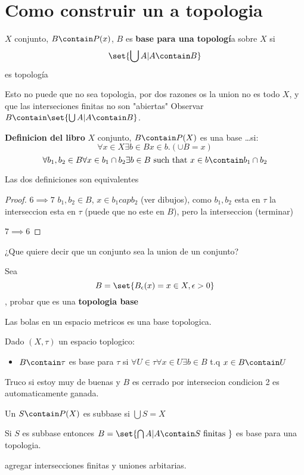 \section{Como construir un a topologia}
\begin{define}
	$X$ conjunto, $B \contain P(x) $, $B$ es \textbf{base para una topologí}a sobre $X$ si
	\[ \set{\bigcup A | A \contain B} \]
	es topología
\end{define}
Esto no puede que no sea topologia, por dos razones os la union no es todo $X$, y que las interseciones finitas no son "abiertas"
Observar $ B \contain \set{\bigcup A | A \contain B} $.

\begin{define}
	\textbf{Definicion del libro} $X$ conjunto, $ B \contain P(X) $ es una base \ldots si:
	\[ \forall x \in X \exists b \in B x \in b. (\cup B = x) \]
	\[ \forall b_1, b_2 \in B \forall x \in b_1 \cap b_2 \exists b \in B \text{ such that } x \in b \contain b_1 \cap b_2 \]
\end{define}

\begin{thm}
	Las dos definiciones son equivalentes
\end{thm}

\begin{proof}
	$ 6 \implies 7 $  $ b_1, b_2 \in B$, $ x \in b_1 cap b_2$ (ver dibujos), como $ b_1, b_2$ esta en $ \tau$ la interseccion esta en $\tau$ (puede que no este en $B$), pero la interseccion (terminar)   
	
	$ 7 \implies 6 $
\end{proof}
¿Que quiere decir que un conjunto sea la union de un conjunto?

\begin{thm}
	Sea \[B = \set{B_\epsilon(x) = x \in X, \epsilon > 0 } \], probar que es una \textbf{topologia base}
\end{thm}
Las bolas en un espacio metricos es una base topologica.
\begin{define}
	Dado $ (X, \tau) $ un espacio toplogico:
	\begin{itemize}
		\item $B \contain \tau$ es base para $\tau $ si $ \forall U \in \tau \forall x \in U \exists b \in B $ t.q $ x \in B \contain U$
	\end{itemize}
\end{define}
Truco si estoy muy de buenas y $B$ es cerrado por intersecion condicion 2 es automaticamente ganada.
\begin{define}
	Un $S \contain P(X) $ es subbase si $ \bigcup S = X$
\end{define}
\begin{theorem}
	Si $S$ es subbase entonces $B = \set{ \bigcap A | A \contain S \text{ finitas }} $ es base para una topologia.
\end{theorem}
agregar intersecciones finitas y uniones arbitarias.
